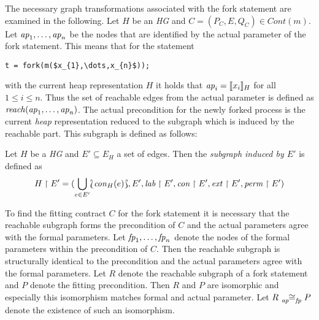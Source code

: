 	The necessary graph transformations associated with the fork
	statement are examined in the following. Let $H$ be an \emph{\ac{HG}} and
	$C = (P_{C}, E, Q_{C})\in\mathit{Cont}(m)$. Let $\mathit{ap}_{1},\dots,\mathit{ap}_{n}$ be
	the nodes that are identified by the actual parameter of the fork statement.
	This means that for the statement
	\begin{lstlisting}
t = fork(m($x_{1},\dots,x_{n}$));
	\end{lstlisting}
	with the current heap representation $H$ it holds that
	$\mathit{ap}_{i} = \llbracket x_{i}\rrbracket_{H}$ for all $1\leq i\leq n$.
	Thus the set of reachable edges from the actual parameter is defined as
	$\mathit{reach}(\mathit{ap}_{1},\dots,\mathit{ap}_{n})$.
	The actual precondition for the newly forked process is
	the current \emph{heap} representation reduced to the subgraph which is
	induced by the reachable part. This subgraph is defined as follows:
	\begin{definition}
		Let $H$ be a  \emph{\ac{HG}} and $E'\subseteq E_{H}$ a set of edges. Then
		the \emph{subgraph induced by $E'$} is defined as
		\begin{equation*}
			H\upharpoonright E' = (\bigcup_{e\in E'}\Lbag\mathit{con}_{H}(e)\Rbag, E',
			\mathit{lab}\upharpoonright E', \mathit{con}\upharpoonright E',\mathit{ext}\upharpoonright E',
			\mathit{perm}\upharpoonright E')
		\end{equation*}
	\end{definition}
	To find the fitting contract $C$ for the fork statement it is necessary that
	the reachable subgraph forms the precondition of $C$ and the actual
	parameters agree with the formal parameters. Let $\mathit{fp}_{1},\dots,\mathit{fp}_{n}$
	denote the nodes of the formal parameters within the precondition of $C$.
	Then the reachable subgraph is structurally identical to the precondition
	and the actual parameters agree with the formal parameters. Let $R$ denote
	the reachable subgraph of a fork statement and $P$ denote the fitting
	precondition. Then $R$ and $P$ are isomorphic and especially this
	isomorphism matches formal and actual parameter. Let $R\afiso P$
	denote the existence of such an isomorphism.

